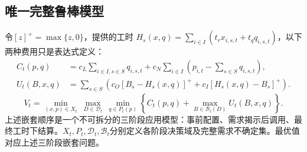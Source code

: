 \documentclass[UTF8,11pt]{ctexart}
\begin{document}
\subsection*{唯一完整鲁棒模型}
令$[z]^+=\max\{z,0\}$，提供的工时
$H_s(x,q)=\sum_{i\in I}(t_rx_{i,s,t}+t_qq_{i,s,t})$，以下两种费用只是表达式定义：
\begin{align*}
C_t(p,q)&=c_L\sum_{i\in I,s\in S}q_{i,s,t}+c_N\sum_{i\in I}\left(p_{i,t}-\sum_{s\in S}q_{i,s,t}\right),\\
U_t(B,x,q)&=\sum_{s\in S}\left(c_O[B_s-H_s(x,q)]^++c_I[H_s(x,q)-B_s]^+\right).
\end{align*}
\begin{equation}
\boxed{V_t=\min_{(x,p)\in X_t}\ \max_{D\in\mathcal D_t}\ \min_{q\in P_t(p)}\left\{C_t(p,q)+\max_{B\in\mathcal B_t(D)}U_t(B,x,q)\right\}.}
\end{equation}
上述嵌套顺序是一个不可拆分的三阶段应用模型：事前配置、需求揭示后调用、最终工时下结算。$X_t,P_t,\mathcal D_t,\mathcal B_t$分别定义各阶段决策域及完整需求不确定集。最优值对应上述三阶段嵌套问题。
\end{document}
